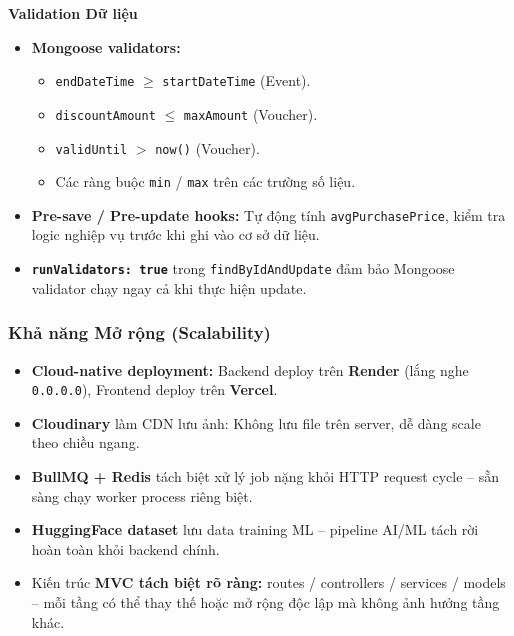 \textbf{Validation Dữ liệu}

\begin{itemize}[leftmargin=*, label={--}]
    \item \textbf{Mongoose validators:}
    \begin{itemize}[label={\(\circ\)}]
        \item \texttt{endDateTime} $\geq$ \texttt{startDateTime} (Event).
        \item \texttt{discountAmount} $\leq$ \texttt{maxAmount} (Voucher).
        \item \texttt{validUntil} $>$ \texttt{now()} (Voucher).
        \item Các ràng buộc \texttt{min} / \texttt{max} trên các trường số liệu.
    \end{itemize}

    \item \textbf{Pre-save / Pre-update hooks:} Tự động tính
    \texttt{avgPurchasePrice}, kiểm tra logic nghiệp vụ trước khi ghi vào
    cơ sở dữ liệu.

    \item \textbf{\texttt{runValidators: true}} trong
    \texttt{findByIdAndUpdate} đảm bảo Mongoose validator chạy ngay cả
    khi thực hiện update.
\end{itemize}

\subsubsection{Khả năng Mở rộng (Scalability)}

\begin{itemize}[leftmargin=*, label={--}]
    \item \textbf{Cloud-native deployment:} Backend deploy trên \textbf{Render}
    (lắng nghe \texttt{0.0.0.0}), Frontend deploy trên \textbf{Vercel}.

    \item \textbf{Cloudinary} làm CDN lưu ảnh: Không lưu file trên server,
    dễ dàng scale theo chiều ngang.

    \item \textbf{BullMQ + Redis} tách biệt xử lý job nặng khỏi HTTP request
    cycle -- sẵn sàng chạy worker process riêng biệt.

    \item \textbf{HuggingFace dataset} lưu data training ML -- pipeline AI/ML
    tách rời hoàn toàn khỏi backend chính.

    \item Kiến trúc \textbf{MVC tách biệt rõ ràng:}
    routes / controllers / services / models -- mỗi tầng có thể thay thế
    hoặc mở rộng độc lập mà không ảnh hưởng tầng khác.
\end{itemize}

